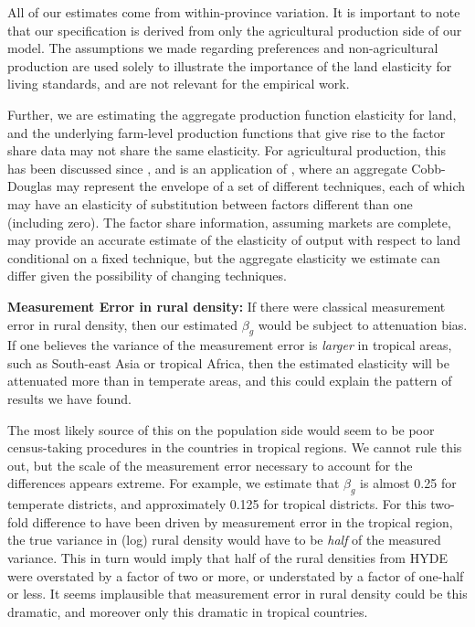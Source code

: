 All of our estimates come from within-province variation. It is important to note that our specification is derived from only the agricultural production side of our model. The assumptions we made regarding preferences and non-agricultural production are used solely to illustrate the importance of the land elasticity for living standards, and are not relevant for the empirical work.



Further, we are estimating the aggregate production function elasticity for land, and the underlying farm-level production functions that give rise to the factor share data may not share the same elasticity. For agricultural production, this has been discussed since \citet{Hayami:1970ly}, and is an application of \citet{houthakker1955}, where an aggregate Cobb-Douglas may represent the envelope of a set of different techniques, each of which may have an elasticity of substitution between factors different than one (including zero). The factor share information, assuming markets are complete, may provide an accurate estimate of the elasticity of output with respect to land conditional on a fixed technique, but the aggregate elasticity we estimate can differ given the possibility of changing techniques. 


\vspace{.5cm}\noindent\textbf{Measurement Error in rural density:} If there were classical measurement error in rural density, then our estimated $\beta_g$ would be subject to attenuation bias. If one believes the variance of the measurement error is \textit{larger} in tropical areas, such as South-east Asia or tropical Africa, then the estimated elasticity will be attenuated more than in temperate areas, and this could explain the pattern of results we have found. 

The most likely source of this on the population side would seem to be poor census-taking procedures in the countries in tropical regions. We cannot rule this out, but the scale of the measurement error necessary to account for the differences appears extreme. For example, we estimate that $\beta_g$ is almost 0.25 for temperate districts, and approximately 0.125 for tropical districts. For this two-fold difference to have been driven by measurement error in the tropical region, the true variance in (log) rural density would have to be \textit{half} of the measured variance. This in turn would imply that half of the rural densities from HYDE were overstated by a factor of two or more, or understated by a factor of one-half or less. It seems implausible that measurement error in rural density could be this dramatic, and moreover only this dramatic in tropical countries.

